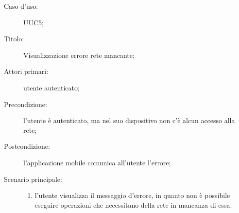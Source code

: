 \documentclass[../../../analisi-dei-requisiti.tex]{subfiles}
\begin{document}
\begin{description}
  \item[Caso d’uso:] UUC5;
  \item[Titolo:] Visualizzazione errore rete mancante;
  \item[Attori primari:] utente autenticato;
  \item[Precondizione:] l'utente è autenticato, ma nel suo dispositivo non c'è alcun accesso alla rete;
  \item[Postcondizione:] l'applicazione mobile comunica all'utente l'errore;
  \item[Scenario principale:]
        \begin{enumerate}
          \item l'utente visualizza il messaggio d'errore, in quanto non è possibile eseguire operazioni che necessitano della rete in mancanza di essa.
        \end{enumerate}
\end{description}
\end{document}
